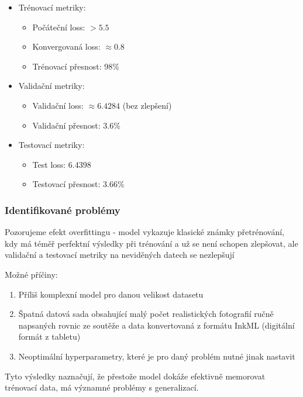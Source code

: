\begin{itemize}
    \item Trénovací metriky:
    \begin{itemize}
        \item Počáteční loss: $> 5.5$
        \item Konvergovaná loss: $\approx 0.8$
        \item Trénovací přesnost: 98\%
    \end{itemize}
    
    \item Validační metriky:
    \begin{itemize}
        \item Validační loss: $\approx 6.4284$ (bez zlepšení)
        \item Validační přesnost: 3.6\%
    \end{itemize}
    
    \item Testovací metriky:
    \begin{itemize}
        \item Test loss: 6.4398
        \item Testovací přesnost: 3.66\%
    \end{itemize}
\end{itemize}



\subsubsection{Identifikované problémy}

Pozorujeme efekt overfittingu - model vykazuje klasické známky přetrénování, kdy má téměř perfektní výsledky při trénování a už se není schopen zlepšovat, ale validační a testovací metriky na neviděných datech se nezlepšují

Možné příčiny:
\begin{enumerate}
    \item Příliš komplexní model pro danou velikost datasetu
    \item Špatná datová sada obsahující malý počet realistických fotografií ručně napsaných rovnic ze soutěže a data konvertovaná z formátu InkML (digitální formát z tabletu)
    \item Neoptimální hyperparametry, které je pro daný problém nutné jinak nastavit
\end{enumerate}

Tyto výsledky naznačují, že přestože model dokáže efektivně memorovat trénovací data, má významné problémy s generalizací.




